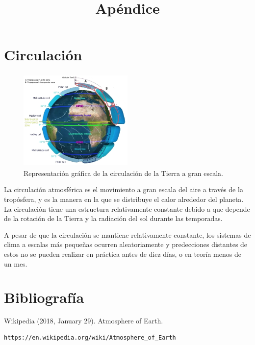 \documentclass{article} %
\begin{document}
\newpage

\section{Circulación}

\begin{figure}
    \includegraphics[height=5cm,width=0.50\textwidth]{Earth_Global_Circulation.jpg}
	\caption{Representación gráfica de la circulación de la Tierra a gran escala.}
\end{figure}

La circulación atmosférica es el movimiento a gran escala del aire a través de la tropósfera, y es la manera en la que se distribuye el calor alrededor del planeta. La circulación tiene una estructura relativamente constante debido a que depende de la rotación de la Tierra y la radiación del sol durante las temporadas.

A pesar de que la circulación se mantiene relativamente constante, los sistemas de clima a escalas más pequeñas ocurren aleatoriamente y predecciones distantes de estos no se pueden realizar en práctica antes de diez días, o en teoría menos de un mes.

\newpage

\section{Bibliografía}
Wikipedia (2018, January 29). Atmosphere of Earth.
\begin{verbatim}
https://en.wikipedia.org/wiki/Atmosphere_of_Earth
\end{verbatim}

\newpage

\title{Apéndice}
\end{document}
